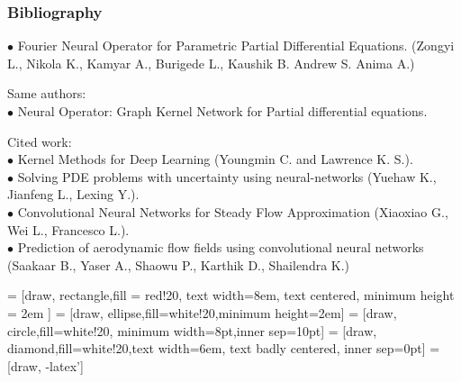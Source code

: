 \documentclass[xcolor=dvipsnames,10pt,aspectratio=169]{beamer}
\begin{document}
\begin{frame}\frametitle{Bibliography}
	$\bullet$ Fourier Neural Operator for Parametric Partial Differential Equations. (Zongyi L., Nikola K., Kamyar A., Burigede L., Kaushik B. Andrew S. Anima A.)\\

	\vspace{0.5cm}

	Same authors:\\
	$\bullet$ Neural Operator: Graph Kernel Network for Partial differential equations.\\

	\vspace{0.5cm}

	Cited work:\\
	$\bullet$ Kernel Methods for Deep Learning (Youngmin C. and Lawrence K. S.).\\
	$\bullet$ Solving PDE problems with uncertainty using neural-networks (Yuehaw K., Jianfeng L., Lexing Y.).\\
	$\bullet$ Convolutional Neural Networks for Steady Flow Approximation (Xiaoxiao G., Wei L., Francesco L.).\\
	$\bullet$ Prediction of aerodynamic flow fields using convolutional neural networks (Saakaar B., Yaser A., Shaowu P., Karthik D., Shailendra K.)
\end{frame}

 = [draw, rectangle,fill = red!20, text width=8em, text centered, minimum height = 2em ]
 = [draw, ellipse,fill=white!20,minimum height=2em]
 = [draw, circle,fill=white!20, minimum width=8pt,inner sep=10pt]
 = [draw, diamond,fill=white!20,text width=6em, text badly centered, inner sep=0pt]
 = [draw, -latex']
\end{document}
